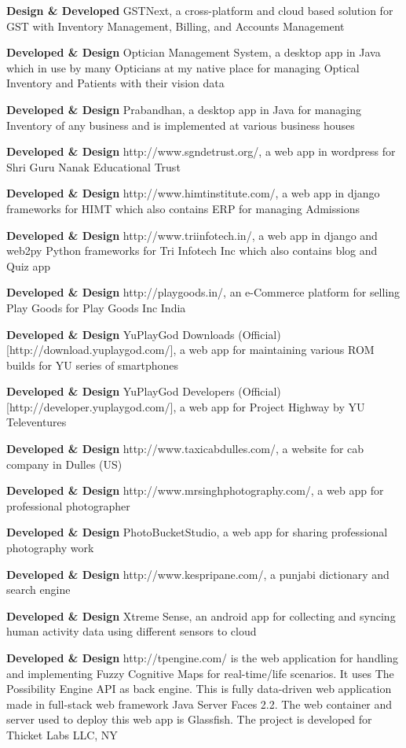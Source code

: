 \documentclass[margin,line]{res}
\begin{document}
\begin{resume}
\textbf{Design \& Developed} GSTNext, a cross-platform and cloud based solution for GST with Inventory Management, Billing, and Accounts Management

\textbf{Developed \& Design} Optician Management System, a desktop app in Java which in use by many Opticians at my native place for managing Optical Inventory and Patients with their vision data

\textbf{Developed \& Design} Prabandhan, a desktop app in Java for managing Inventory of any business and is implemented at various business houses

\textbf{Developed \& Design} http://www.sgndetrust.org/, a web app in wordpress for Shri Guru Nanak Educational Trust

\textbf{Developed \& Design} http://www.himtinstitute.com/, a web app in django frameworks for HIMT which also contains ERP for managing Admissions

\textbf{Developed \& Design} http://www.triinfotech.in/, a web app in django and web2py Python frameworks for Tri Infotech Inc which also contains blog and Quiz app

\textbf{Developed \& Design} http://playgoods.in/, an e-Commerce platform for selling Play Goods for Play Goods Inc India

\textbf{Developed \& Design} YuPlayGod Downloads (Official) [http://download.yuplaygod.com/], a web app for maintaining various ROM builds for YU series of smartphones

\textbf{Developed \& Design} YuPlayGod Developers (Official) [http://developer.yuplaygod.com/], a web app for Project Highway by YU Televentures

\textbf{Developed \& Design} http://www.taxicabdulles.com/, a website for cab company in Dulles (US)

\textbf{Developed \& Design} http://www.mrsinghphotography.com/, a web app for professional photographer

\textbf{Developed \& Design} PhotoBucketStudio, a web app for sharing professional photography work

\textbf{Developed \& Design} http://www.kespripane.com/, a punjabi dictionary and search engine

\textbf{Developed \& Design} Xtreme Sense, an android app for collecting and syncing human activity data using different sensors to cloud

\textbf{Developed \& Design} http://tpengine.com/ is the web application for handling and implementing Fuzzy Cognitive Maps for real-time/life scenarios. It uses The Possibility Engine API as back engine. This is fully data-driven web application made in full-stack web framework Java Server Faces 2.2. The web container and server used to deploy this web app is Glassfish. The project is developed for  Thicket Labs LLC, NY


\end{resume}
\end{document}
